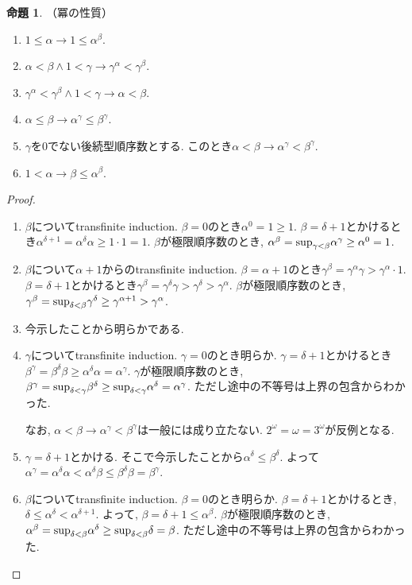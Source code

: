 \documentclass[a4paper, twoside]{bxjsarticle}
\theoremstyle{definition}
\newtheorem{prop}[thm]{命題}
\begin{document}
        \begin{prop}
            （冪の性質）
            
            \begin{enumerate}
                \item $1\leq\alpha \to 1\leq\alpha^\beta$.
                \item $\alpha<\beta \land 1<\gamma \to \gamma^\alpha<\gamma^\beta$.
                \item $\gamma^\alpha<\gamma^\beta \land 1<\gamma \to \alpha<\beta$.
                \item $\alpha\leq\beta \to \alpha^\gamma\leq\beta^\gamma$.
                \item $\gamma$を0でない後続型順序数とする. このとき$\alpha<\beta \to \alpha^\gamma<\beta^\gamma$.
                \item $1<\alpha \to \beta\leq\alpha^\beta$.
            \end{enumerate}
        \end{prop}
        \begin{proof}
            \begin{enumerate}
                \item $\beta$についてtransfinite induction. $\beta=0$のとき$\alpha^0=1\geq1$. $\beta=\delta+1$とかけるとき$\alpha^{\delta+1}=\alpha^\delta\alpha\geq1\cdot1=1$. $\beta$が極限順序数のとき, $\alpha^\beta={\rm sup}_{\gamma<\beta}\alpha^\gamma \geq\alpha^0=1$.
                \item $\beta$について$\alpha+1$からのtransfinite induction. $\beta=\alpha+1$のとき$\gamma^\beta=\gamma^\alpha\gamma>\gamma^\alpha\cdot1$. $\beta=\delta+1$とかけるとき$\gamma^\beta=\gamma^\delta\gamma>\gamma^\delta>\gamma^\alpha$. $\beta$が極限順序数のとき, $\gamma^\beta={\rm sup}_{\delta<\beta}\gamma^\delta\geq\gamma^{\alpha+1}>\gamma^\alpha$.
                \item 今示したことから明らかである.
                \item $\gamma$についてtransfinite induction. $\gamma=0$のとき明らか. $\gamma=\delta+1$とかけるとき$\beta^\gamma=\beta^\delta\beta\geq\alpha^\delta\alpha=\alpha^\gamma$. $\gamma$が極限順序数のとき, $\beta^\gamma={\rm sup}_{\delta<\gamma}\beta^\delta\geq{\rm sup}_{\delta<\gamma}\alpha^\delta=\alpha^\gamma$. ただし途中の不等号は上界の包含からわかった.
                
                なお, $\alpha<\beta\to\alpha^\gamma<\beta^\gamma$は一般には成り立たない. $2^\omega = \omega = 3^\omega$が反例となる.
                \item $\gamma=\delta+1$とかける. そこで今示したことから$\alpha^\delta\leq\beta^\delta$. よって$\alpha^\gamma=\alpha^\delta\alpha<\alpha^\delta\beta\leq\beta^\delta\beta=\beta^\gamma$.
                \item $\beta$についてtransfinite induction. $\beta=0$のとき明らか. $\beta=\delta+1$とかけるとき, $\delta\leq\alpha^\delta<\alpha^{\delta+1}$. よって, $\beta=\delta+1\leq\alpha^\beta$. $\beta$が極限順序数のとき, $\alpha^\beta={\rm sup}_{\delta<\beta}\alpha^\delta\geq{\rm sup}_{\delta<\beta}\delta=\beta$. ただし途中の不等号は上界の包含からわかった.
            \end{enumerate}
        \end{proof}
\end{document}
